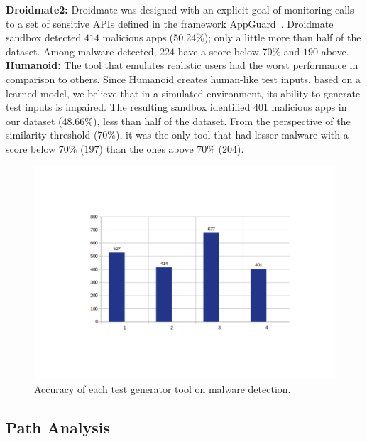 \newline
\textbf{Droidmate2:} Droidmate was designed with an explicit goal of monitoring calls to a set of sensitive APIs defined in the framework AppGuard~\cite{DBLP:conf/esorics/BackesGHMS13}.  Droidmate sandbox detected $414$ malicious apps (50.24\%); only a little more than half of the dataset. Among malware detected, $224$ have a score below 70\% and $190$ above.\newline
\newline
\textbf{Humanoid:}  The tool that emulates realistic users had the worst performance in comparison to others. Since Humanoid creates human-like test inputs, based on a learned model, we believe that in a simulated environment, its ability to generate test inputs is impaired. The resulting sandbox identified 401 malicious apps in our dataset (48.66\%), less than half of the dataset. From the perspective of the similarity threshold (70\%), it was the only tool that had lesser malware with a score below 70\% ($197$) than the ones above 70\% ($204$).


\begin{obs}{1}{}
 \end{obs}

\begin{figure}[ht]
\centering
\includegraphics[scale=0.3]{images/accuracy.pdf}
\caption{Accuracy of each test generator tool on malware detection.}
 \label{fig:accuracy}
\end{figure}

\subsection{Path Analysis}\label{sec:path}

